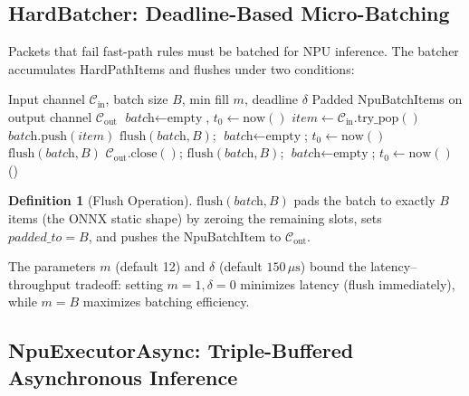 \documentclass[11pt,a4paper,twoside]{article}
\theoremstyle{definition}
\newtheorem{definition}{Definition}[section]
\theoremstyle{remark}
\begin{document}
\subsection{HardBatcher: Deadline-Based Micro-Batching}

Packets that fail fast-path rules must be batched for NPU inference. The batcher accumulates HardPathItems and flushes under two conditions:

\begin{algorithm}[H]
\caption{\textsc{HardBatch}: Deadline-based micro-batching}
\label{alg:hard-batcher}
\begin{algorithmic}[1]
\Require Input channel $\mathcal{C}_{\text{in}}$, batch size $B$, min fill $m$, deadline $\delta$
\Ensure Padded NpuBatchItems on output channel $\mathcal{C}_{\text{out}}$
\State $\textit{batch} \gets \text{empty}$, $t_0 \gets \text{now}()$
\Loop
  \State $\textit{item} \gets \mathcal{C}_{\text{in}}.\text{try\_pop}()$
    \State $\textit{batch}.\text{push}(\textit{item})$
     
      \State $\text{flush}(\textit{batch}, B)$; $\textit{batch} \gets \text{empty}$; $t_0 \gets \text{now}()$
    \EndIf
     $\text{flush}(\textit{batch}, B)$ \EndIf
    \State $\mathcal{C}_{\text{out}}.\text{close}()$; \Return
    \State $\text{flush}(\textit{batch}, B)$; $\textit{batch} \gets \text{empty}$; $t_0 \gets \text{now}()$
  \Else
    \State {}() 
  \EndIf
\EndLoop
\end{algorithmic}
\end{algorithm}

\begin{definition}[Flush Operation]
$\text{flush}(\textit{batch}, B)$ pads the batch to exactly $B$ items (the ONNX static shape) by zeroing the remaining slots, sets $\textit{padded\_to} = B$, and pushes the NpuBatchItem to $\mathcal{C}_{\text{out}}$.
\end{definition}

The parameters $m$ (default 12) and $\delta$ (default $150\,\mu\text{s}$) bound the latency--throughput tradeoff: setting $m = 1, \delta = 0$ minimizes latency (flush immediately), while $m = B$ maximizes batching efficiency.

\subsection{NpuExecutorAsync: Triple-Buffered Asynchronous Inference}
\end{document}
